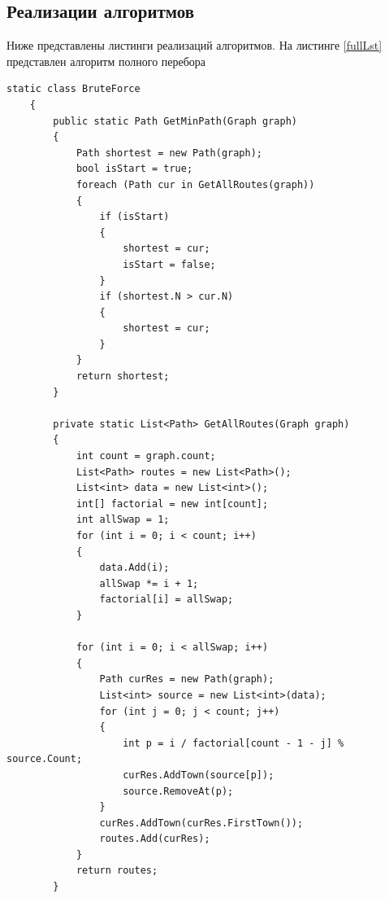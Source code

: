 \documentclass{article}
\begin{document}
	\subsection{Реализации алгоритмов}
	Ниже представлены листинги реализаций алгоритмов.
	На листинге \hyperref[fullLst]{\ref{fullLst}} представлен алгоритм полного перебора
	\begin{lstlisting}[label=fullLst, caption=Алгоритм полного перебора]
	static class BruteForce
    {
        public static Path GetMinPath(Graph graph)
        {
            Path shortest = new Path(graph);
            bool isStart = true;
            foreach (Path cur in GetAllRoutes(graph))
            {
                if (isStart)
                {
                    shortest = cur;
                    isStart = false;
                }
                if (shortest.N > cur.N)
                {
                    shortest = cur;
                }
            }
            return shortest;
        }

        private static List<Path> GetAllRoutes(Graph graph)
        {
            int count = graph.count;
            List<Path> routes = new List<Path>();
            List<int> data = new List<int>();
            int[] factorial = new int[count];
            int allSwap = 1;
            for (int i = 0; i < count; i++)
            {
                data.Add(i);
                allSwap *= i + 1;
                factorial[i] = allSwap;
            }

            for (int i = 0; i < allSwap; i++)
            {
                Path curRes = new Path(graph);
                List<int> source = new List<int>(data);
                for (int j = 0; j < count; j++)
                {
                    int p = i / factorial[count - 1 - j] % source.Count;
                    curRes.AddTown(source[p]);
                    source.RemoveAt(p);
                }
                curRes.AddTown(curRes.FirstTown());
                routes.Add(curRes);
            }
            return routes;
        }
	\end{lstlisting}
\end{document}
